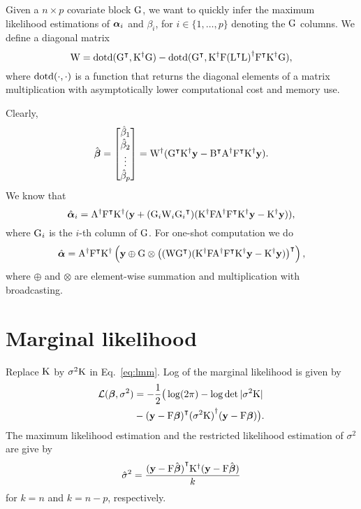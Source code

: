 \documentclass[twocolumn,draft]{article}
\begin{document}
	Given a $n\times p$ covariate block $\mathrm{G}$, we want to quickly infer the
	maximum likelihood estimations of $\boldsymbol{\alpha}_i$ and $\beta_i$, for
	$i \in \{1, \dots, p\}$ denoting the $\mathrm{G}$ columns.
	We define a diagonal matrix
	\begin{equation*}
			\mathrm{W} = \mathrm{dotd} ({\mathrm{G}}^\intercal, {\mathrm{K}}^{\dagger}\mathrm{G}) -
				       \mathrm{dotd} ({\mathrm{G}}^\intercal, {\mathrm{K}}^{\dagger}\mathrm{F}
				       				 {({\mathrm{L}}^\intercal\mathrm{L})}^{\dagger}{\mathrm{F}}^\intercal{\mathrm{K}}^{\dagger}\mathrm{G}),
	\end{equation*}
	where $\mathrm{dotd} (\cdot, \cdot)$ is a function that returns the diagonal elements
	of a matrix multiplication with asymptotically lower computational cost and
	memory use.

	Clearly,
	\begin{equation*}
			\hat{\boldsymbol{\beta}} =
				\begin{bmatrix}
							\hat\beta_1 \\
									\hat\beta_2 \\
											\vdots \\
													\hat\beta_p
														\end{bmatrix}
															= {\mathrm{W}}^{\dagger}({\mathrm{G}}^\intercal{\mathrm{K}}^{\dagger}\mathbf{y}
																-{\mathrm{B}}^\intercal{\mathrm{A}}^{\dagger}{\mathrm{F}}^\intercal{\mathrm{K}}^{\dagger}\mathbf{y}).
	\end{equation*}
	We know that
	\begin{equation*}
			\hat{\boldsymbol{\alpha}}_i = {\mathrm{A}}^{\dagger}{\mathrm{F}}^\intercal{\mathrm{K}}^{\dagger}
				(\mathbf{y} + (\mathrm{G}_i \mathrm{W}_i {\mathrm{G}_i}^\intercal)
					({\mathrm{K}}^{\dagger}\mathrm{F}{\mathrm{A}}^{\dagger}{\mathrm{F}}^\intercal{\mathrm{K}}^{\dagger}\mathbf{y} - {\mathrm{K}}^{\dagger}\mathbf{y})),
	\end{equation*}
	where $\mathrm{G}_i$ is the $i$-th column of $\mathrm{G}$.
	For one-shot computation we do
	\begin{equation*}
			\hat{\boldsymbol{\alpha}} = {\mathrm{A}}^{\dagger}{\mathrm{F}}^\intercal{\mathrm{K}}^{\dagger}
				\left(\mathbf{y} \oplus \mathrm{G} \otimes
					{\left((\mathrm{W}{\mathrm{G}}^\intercal)
						  ({\mathrm{K}}^{\dagger}\mathrm{F}{\mathrm{A}}^{\dagger}{\mathrm{F}}^\intercal{\mathrm{K}}^{\dagger}\mathbf{y}- {\mathrm{K}}^{\dagger}\mathbf{y})\right)}^\intercal\right),
	\end{equation*}
	where $\oplus$ and $\otimes$ are element-wise summation and multiplication
	with broadcasting.

	\section{Marginal likelihood}

	Replace $\mathrm{K}$ by $\sigma^2\mathrm{K}$ in Eq.~\eqref{eq:lmm}.
	Log of the marginal likelihood is given by
	\begin{align*}
		  \mathcal{L}(\boldsymbol{\beta}, \sigma^2) &=
		  	-\frac{1}{2}\big(\log(2\pi) - \log\det|\sigma^2\mathrm{K}| \\
				&- {(\mathbf{y} - \mathrm{F}\boldsymbol{\beta})}^\intercal {(\sigma^2\mathrm{K})}^{\dagger} (\mathbf{y} - \mathrm{F}\boldsymbol{\beta})
					\big).
	\end{align*}
	The maximum likelihood estimation and the restricted likelihood estimation of
	$\sigma^2$ are give by
	\begin{equation*}
			\hat\sigma^2 = \frac{
						{(\mathbf{y} - \mathrm{F}\hat{\boldsymbol{\beta}})}^\intercal
									{\mathrm{K}}^{\dagger}
											(\mathbf{y} - \mathrm{F}\hat{\boldsymbol{\beta}})
												}{k}
	\end{equation*}
	for $k = n$ and $k = n - p$, respectively.
\end{document}
